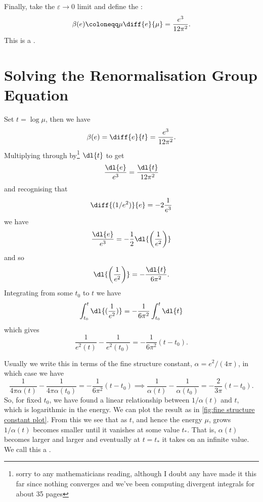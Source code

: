 \documentclass[fleqn]{NotesClass}
\begin{document}
    Finally, take the \(\varepsilon \to 0\) limit and define the \index{\(\beta\)}:
    \begin{equation}
        \beta(e) \coloneqq \mu \diff{e}{\mu} = \frac{e^3}{12\pi^2}.
    \end{equation}
    This is a .
    
    \section{Solving the Renormalisation Group Equation}
    Set \(t = \log \mu\), then we have
    \begin{equation}
        \beta(e) = \diff{e}{t} = \frac{e^3}{12\pi^2}.
    \end{equation}
    Multiplying through by\footnote{sorry to any mathematicians reading, although I doubt any have made it this far since nothing converges and we've been computing divergent integrals for about 35 pages} \(\dl{t}\) to get
    \begin{equation}
        \frac{\dl{e}}{e^3} = \frac{\dl{t}}{12\pi^2}
    \end{equation}
    and recognising that
    \begin{equation}
        \diff{(1/e^2)}{e} = -2\frac{1}{e^3}
    \end{equation}
    we have
    \begin{equation}
        \frac{\dl{e}}{e^3} = -\frac{1}{2} \dl{\left( \frac{1}{e^2} \right)}
    \end{equation}
    and so
    \begin{equation}
        \dl{\left( \frac{1}{e^2} \right)} = -\frac{\dl{t}}{6\pi^2}.
    \end{equation}
    Integrating from some \(t_0\) to \(t\) we have
    \begin{equation}
        \int_{t_0}^{t} \dl{(\frac{1}{e^2})} = -\frac{1}{6\pi^2} \int_{t_0}^{t} \dl{t}
    \end{equation}
    which gives
    \begin{equation}
        \frac{1}{e^2(t)} - \frac{1}{e^2(t_0)} = - \frac{1}{6\pi^2}(t - t_0).
    \end{equation}
    
    Usually we write this in terms of the fine structure constant, \(\alpha = e^2/(4\pi)\), in which case we have
    \begin{equation}
        \frac{1}{4\pi\alpha(t)} - \frac{1}{4\pi\alpha(t_0)} = -\frac{1}{6\pi^2}(t - t_0) \implies \frac{1}{\alpha(t)} - \frac{1}{\alpha(t_0)} = -\frac{2}{3\pi}(t - t_0).
    \end{equation}
    So, for fixed \(t_0\), we have found a linear relationship between \(1/\alpha(t)\) and \(t\), which is logarithmic in the energy.
    We can plot the result as in \cref{fig:fine structure constant plot}.
    From this we see that as \(t\), and hence the energy \(\mu\), grows \(1/\alpha(t)\) becomes smaller until it vanishes at some value \(t_*\).
    That is, \(\alpha(t)\) becomes larger and larger and eventually at \(t = t_*\) it takes on an infinite value.
    We call this a .
    
\end{document}

